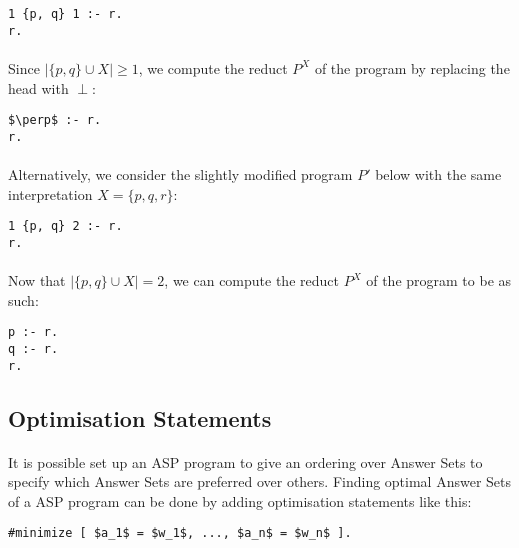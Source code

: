 \documentclass{article}
\theoremstyle{plain}
\theoremstyle{definition}
\begin{document}
\begin{multicols}{2}
\begin{lstlisting}
1 {p, q} 1 :- r.
r.
\end{lstlisting}

\paragraph{} Since $| \{ p, q \} \cup X | \geq 1$, we compute the reduct $P^X$ of the program by replacing the head with $\perp$:

\begin{lstlisting}[mathescape=true]
$\perp$ :- r.
r.
\end{lstlisting}

\paragraph{} Alternatively, we consider the slightly modified program $P'$ below with the same interpretation $X = \{p, q, r\}$:

\begin{lstlisting}
1 {p, q} 2 :- r.
r.
\end{lstlisting}

\paragraph{} Now that $| \{ p, q \} \cup X | = 2$, we can compute the reduct $P^X$ of the program to be as such:

\begin{lstlisting}
p :- r.
q :- r.
r.
\end{lstlisting}

\subsection{Optimisation Statements}

\paragraph{} It is possible set up an ASP program to give an ordering over Answer Sets to specify which Answer Sets are preferred over others. Finding optimal Answer Sets of a ASP program can be done by adding optimisation statements like this:

\begin{lstlisting}[mathescape=true]
#minimize [ $a_1$ = $w_1$, ..., $a_n$ = $w_n$ ].
\end{lstlisting}


\end{multicols}
\end{document}
